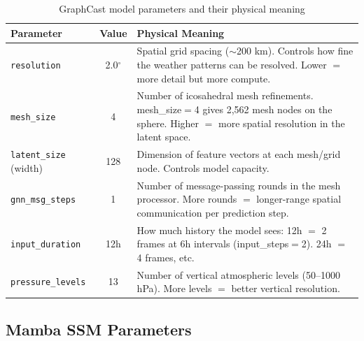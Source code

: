 \documentclass[11pt,a4paper]{article}
\begin{document}
\begin{table}[H]
\centering
\caption{GraphCast model parameters and their physical meaning}
\begin{tabular}{p{3.5cm}cp{7cm}}
\toprule
Parameter & Value & Physical Meaning \\
\midrule
\texttt{resolution} & 2.0$^\circ$ & Spatial grid spacing ($\sim$200 km). Controls how fine the weather patterns can be resolved. Lower $=$ more detail but more compute. \\
\texttt{mesh\_size} & 4 & Number of icosahedral mesh refinements. mesh\_size$=$4 gives 2,562 mesh nodes on the sphere. Higher $=$ more spatial resolution in the latent space. \\
\texttt{latent\_size} (width) & 128 & Dimension of feature vectors at each mesh/grid node. Controls model capacity. \\
\texttt{gnn\_msg\_steps} & 1 & Number of message-passing rounds in the mesh processor. More rounds $=$ longer-range spatial communication per prediction step. \\
\texttt{input\_duration} & 12h & How much history the model sees: 12h $=$ 2 frames at 6h intervals (input\_steps$=$2). 24h $=$ 4 frames, etc. \\
\texttt{pressure\_levels} & 13 & Number of vertical atmospheric levels (50--1000 hPa). More levels $=$ better vertical resolution. \\
\bottomrule
\end{tabular}
\end{table}

\subsection{Mamba SSM Parameters}
\end{document}
